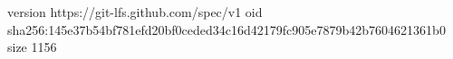 version https://git-lfs.github.com/spec/v1
oid sha256:145e37b54bf781efd20bf0ceded34c16d42179fc905e7879b42b7604621361b0
size 1156
